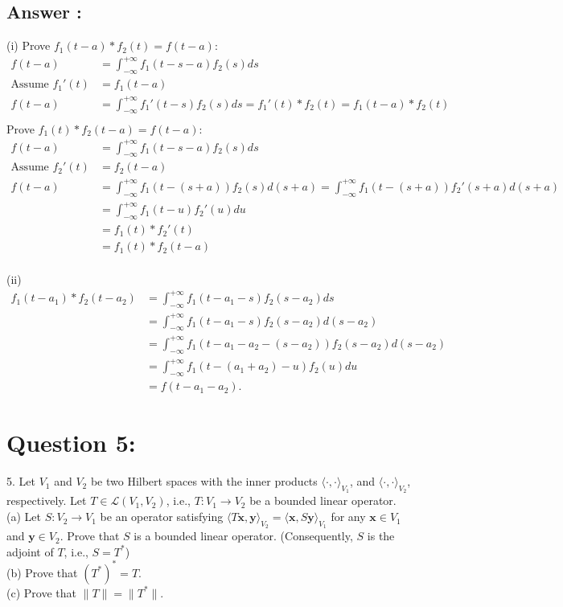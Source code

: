 \documentclass[a4paper,12pt]{article}
\begin{document}
\subsection*{Answer :}
(i) 
Prove \(f_1(t - a) * f_2(t) = f(t - a)\):
\begin{align*}
    f(t - a) &= \int_{-\infty}^{+\infty}f_1(t - s - a)f_2(s)ds \\
    \text{Assume }f_1'(t) &= f_1(t - a) \\
    f(t - a) &= \int_{-\infty}^{+\infty}f_1'(t - s)f_2(s)ds = f_1'(t)*f_2(t) = f_1(t - a)*f_2(t) \\
\end{align*}
Prove \(f_1(t) * f_2(t - a) = f(t - a)\):
\begin{align*}
    f(t - a) &= \int_{-\infty}^{+\infty}f_1(t - s - a)f_2(s)ds \\
    \text{Assume }f_2'(t) &= f_2(t - a) \\
    f(t - a) &= \int_{-\infty}^{+\infty}f_1(t - (s+a))f_2(s)d(s + a) = \int_{-\infty}^{+\infty}f_1(t - (s+a))f_2'(s + a)d(s + a) \\
    &= \int_{-\infty}^{+\infty}f_1(t - u)f_2'(u)du \\
    &= f_1(t)*f_2'(t)  \\
    &= f_1(t)*f_2(t-a) \\
\end{align*}

\vspace{1cm}
\noindent
(ii)
\begin{align*}
    f_1(t-a_1) * f_2(t-a_2) &= \int_{-\infty}^{+\infty}f_1(t-a_1 - s)f_2(s-a_2)ds\\
    &= \int_{-\infty}^{+\infty}f_1(t-a_1 - s)f_2(s-a_2)d(s - a_2) \\
    &= \int_{-\infty}^{+\infty}f_1(t-a_1 - a_2 - (s - a_2))f_2(s-a_2)d(s - a_2) \\
    &= \int_{-\infty}^{+\infty}f_1(t-(a_1 + a_2) - u)f_2(u)du \\
    &=f(t-a_1-a_2).
\end{align*}

\section*{Question 5:}
5. Let \(V_1\) and \(V_2\) be two Hilbert spaces with the inner products \(\langle \cdot, \cdot \rangle_{V_1}\), and \(\langle \cdot, \cdot\rangle_{V_2}\), respectively.
Let \(T \in \mathcal{L}(V_1, V_2)\), i.e., \(T: V_1 \to V_2\) be a bounded linear operator. \\
(a) Let \(S:V_2 \to V_1\) be an operator satisfying \(\langle T\bm{x}, \bm{y}\rangle_{V_2} = \langle \bm{x}, S\bm{y}\rangle_{V_1}\) for any \(\bm{x} \in V_1\) and \(\bm{y} \in V_2\).
Prove that \(S\) is a bounded linear operator. (Consequently, \(S\) is the adjoint of \(T\), i.e., \(S = T^*\)) \\
(b) Prove that \((T^*)^* = T\). \\
(c) Prove that \(\|T\| = \|T^*\|\).
\end{document}
